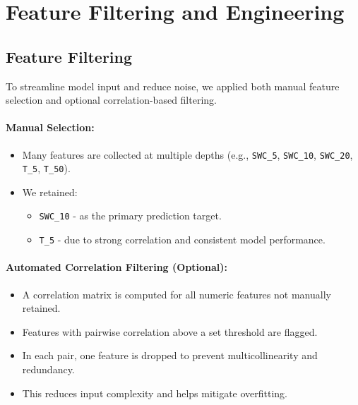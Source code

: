 \documentclass{article}
\begin{document}
\section{Feature Filtering and Engineering}

\subsection{Feature Filtering}

To streamline model input and reduce noise, we applied both manual feature selection and optional correlation-based filtering.

\paragraph{Manual Selection:}
\begin{itemize}
    \item Many features are collected at multiple depths (e.g., \texttt{SWC\_5}, \texttt{SWC\_10}, \texttt{SWC\_20}, \texttt{T\_5}, \texttt{T\_50}).
    \item We retained:
    \begin{itemize}
        \item \texttt{SWC\_10} - as the primary prediction target.
        \item \texttt{T\_5} - due to strong correlation and consistent model performance.
    \end{itemize}
\end{itemize}

\paragraph{Automated Correlation Filtering (Optional):}
\begin{itemize}
    \item A correlation matrix is computed for all numeric features not manually retained.
    \item Features with pairwise correlation above a set threshold are flagged.
    \item In each pair, one feature is dropped to prevent multicollinearity and redundancy.
    \item This reduces input complexity and helps mitigate overfitting.
\end{itemize}
\end{document}
